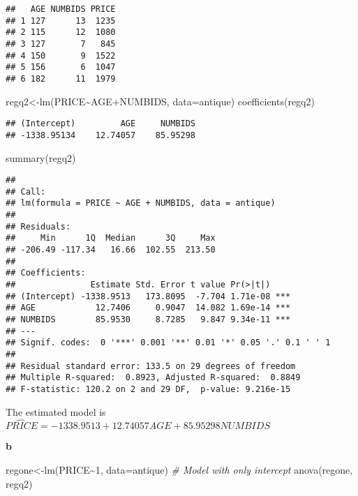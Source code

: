 \documentclass[
]{article}
\newenvironment{Shaded}{\begin{snugshade}}{\end{snugshade}}
\newcommand{\AttributeTok}[1]{\textcolor[rgb]{0.77,0.63,0.00}{#1}}
\newcommand{\CommentTok}[1]{\textcolor[rgb]{0.56,0.35,0.01}{\textit{#1}}}
\newcommand{\DecValTok}[1]{\textcolor[rgb]{0.00,0.00,0.81}{#1}}
\newcommand{\FunctionTok}[1]{\textcolor[rgb]{0.00,0.00,0.00}{#1}}
\newcommand{\NormalTok}[1]{#1}
\newcommand{\OtherTok}[1]{\textcolor[rgb]{0.56,0.35,0.01}{#1}}
\newcommand{\SpecialCharTok}[1]{\textcolor[rgb]{0.00,0.00,0.00}{#1}}
\begin{document}
\begin{verbatim}
##   AGE NUMBIDS PRICE
## 1 127      13  1235
## 2 115      12  1080
## 3 127       7   845
## 4 150       9  1522
## 5 156       6  1047
## 6 182      11  1979
\end{verbatim}

\begin{Shaded}
\begin{Highlighting}[]
\NormalTok{regq2}\OtherTok{\textless{}{-}}\FunctionTok{lm}\NormalTok{(PRICE}\SpecialCharTok{\textasciitilde{}}\NormalTok{AGE}\SpecialCharTok{+}\NormalTok{NUMBIDS, }\AttributeTok{data=}\NormalTok{antique)}
\FunctionTok{coefficients}\NormalTok{(regq2)}
\end{Highlighting}
\end{Shaded}

\begin{verbatim}
## (Intercept)         AGE     NUMBIDS 
## -1338.95134    12.74057    85.95298
\end{verbatim}

\begin{Shaded}
\begin{Highlighting}[]
\FunctionTok{summary}\NormalTok{(regq2)}
\end{Highlighting}
\end{Shaded}

\begin{verbatim}
## 
## Call:
## lm(formula = PRICE ~ AGE + NUMBIDS, data = antique)
## 
## Residuals:
##     Min      1Q  Median      3Q     Max 
## -206.49 -117.34   16.66  102.55  213.50 
## 
## Coefficients:
##               Estimate Std. Error t value Pr(>|t|)    
## (Intercept) -1338.9513   173.8095  -7.704 1.71e-08 ***
## AGE            12.7406     0.9047  14.082 1.69e-14 ***
## NUMBIDS        85.9530     8.7285   9.847 9.34e-11 ***
## ---
## Signif. codes:  0 '***' 0.001 '**' 0.01 '*' 0.05 '.' 0.1 ' ' 1
## 
## Residual standard error: 133.5 on 29 degrees of freedom
## Multiple R-squared:  0.8923, Adjusted R-squared:  0.8849 
## F-statistic: 120.2 on 2 and 29 DF,  p-value: 9.216e-15
\end{verbatim}

The estimated model is
\(\hat{PRICE}= -1338.9513 + 12.74057AGE +85.95298NUMBIDS\)

\textbf{b}

\begin{Shaded}
\begin{Highlighting}[]
\NormalTok{regone}\OtherTok{\textless{}{-}}\FunctionTok{lm}\NormalTok{(PRICE}\SpecialCharTok{\textasciitilde{}}\DecValTok{1}\NormalTok{, }\AttributeTok{data=}\NormalTok{antique) }\CommentTok{\# Model with only intercept}
\FunctionTok{anova}\NormalTok{(regone, regq2)}
\end{Highlighting}
\end{Shaded}
\end{document}
